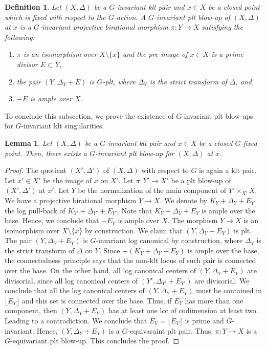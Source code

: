 \documentclass{amsart}
\newtheorem{lemma}[theorem]{Lemma}
\newtheorem{definition}[theorem]{Definition}
\theoremstyle{remark}
\numberwithin{equation}{section}
\begin{document}
\begin{definition}
Let $(X,\Delta)$ be a $G$-invariant klt pair and $x\in X$ be a closed point which is fixed with respect to the $G$-action.
A {\em $G$-invariant plt blow-up} of $(X,\Delta)$ at $x$ 
is a $G$-invariant projective birational morphism $\pi\colon Y\rightarrow X$ satisfying the following:
\begin{enumerate}
\item $\pi$ is an isomorphism over $X\setminus \{x\}$ and the pre-image of $x\in X$ is a prime divisor $E\subset Y$, 
\item the pair $(Y,\Delta_Y+E)$ is $G$-plt, where $\Delta_Y$ is the strict transform of $\Delta$, and
\item $-E$ is ample over $X$.
\end{enumerate}
\end{definition}

To conclude this subsection, we prove the existence
of $G$-invariant plt blow-ups for $G$-invariant klt singularities.

\begin{lemma}\label{lem:existence-g-inv-plt}
Let $(X,\Delta)$ be a $G$-invariant klt pair 
and $x\in X$ be a closed $G$-fixed point.
Then, there exists a $G$-invariant plt blow-up for $(X,\Delta)$ at $x$.
\end{lemma} 

\begin{proof}
The quotient $(X',\Delta')$ of $(X,\Delta)$ with respect to $G$ is again a klt pair. Let $x'\in X'$ be the image of $x$ on $X'$.
Let $\pi\colon Y'\rightarrow X'$ be a plt blow-up of $(X',\Delta')$ at $x'$.
Let $Y$ be the normalization of the main component of
$Y'\times_{X'} X$.
We have a projective birational morphism 
$Y\rightarrow X$.
We denote by $K_Y+\Delta_Y+E_Y$ the log pull-back
of $K_{Y'}+\Delta_{Y'}+E_{Y'}$.
Note that $K_Y+\Delta_Y+E_Y$ is ample over the base.
Hence, we conclude that $-E_Y$ is ample over $X$.
The morphism $Y\rightarrow X$ is an isomorphism over
$X\setminus \{x\}$ by construction.
We claim that $(Y,\Delta_Y+E_Y)$ is plt.
The pair $(Y,\Delta_Y+E_Y)$ is $G$-invariant log canonical by construction, where $\Delta_Y$ is the strict transform
of $\Delta$ on $Y$.
Since $-(K_Y+\Delta_Y+E_Y)$ is ample over the base,
the connectedness principle says that the non-klt locus
of such pair is connected over the base.
On the other hand, all log canonical centers of $(Y,\Delta_Y+E_Y)$ are divisorial,
since all log canonical centers of $(Y',\Delta_{Y'}+E_{Y'})$
are divisorial.
We conclude that all the log canonical centers
of $(Y,\Delta_Y+E_Y)$ must be contained in
$\lfloor E_Y\rfloor$
and this set is connected over the base.
Thus, if $E_Y$ has more than one component, then
$(Y,\Delta_Y+E_Y)$ has at least one lcc of codimension at least two. Leading to a contradiction.
We conclude that $E_Y=\lfloor E_Y\rfloor$ is prime
and $G$-invariant.
Hence, $(Y,\Delta_Y+E_Y)$ is a $G$-equivaraint plt pair.
Thus, $\pi\colon Y\rightarrow X$ is a $G$-equivariant plt blow-up. This concludes the proof.
\end{proof}
\end{document}
